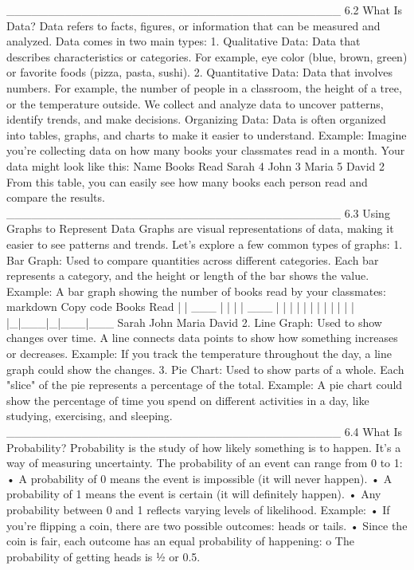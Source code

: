 ________________________________________
6.2 What Is Data?
Data refers to facts, figures, or information that can be measured and analyzed. Data comes in two main types:
1.	Qualitative Data: Data that describes characteristics or categories. For example, eye color (blue, brown, green) or favorite foods (pizza, pasta, sushi).
2.	Quantitative Data: Data that involves numbers. For example, the number of people in a classroom, the height of a tree, or the temperature outside.
We collect and analyze data to uncover patterns, identify trends, and make decisions.
Organizing Data:
Data is often organized into tables, graphs, and charts to make it easier to understand.
Example: Imagine you're collecting data on how many books your classmates read in a month. Your data might look like this:
Name	Books Read
Sarah	4
John	3
Maria	5
David	2
From this table, you can easily see how many books each person read and compare the results.
________________________________________
6.3 Using Graphs to Represent Data
Graphs are visual representations of data, making it easier to see patterns and trends. Let’s explore a few common types of graphs:
1.	Bar Graph: Used to compare quantities across different categories. Each bar represents a category, and the height or length of the bar shows the value.
Example: A bar graph showing the number of books read by your classmates:
markdown
Copy code
Books Read
|
|        ___
|       |   |
|  ___  |   |
| |   | |   |
| |   | |   |
|_|___|_|___|___
  Sarah John Maria David
2.	Line Graph: Used to show changes over time. A line connects data points to show how something increases or decreases.
Example: If you track the temperature throughout the day, a line graph could show the changes.
3.	Pie Chart: Used to show parts of a whole. Each "slice" of the pie represents a percentage of the total.
Example: A pie chart could show the percentage of time you spend on different activities in a day, like studying, exercising, and sleeping.
________________________________________
6.4 What Is Probability?
Probability is the study of how likely something is to happen. It’s a way of measuring uncertainty. The probability of an event can range from 0 to 1:
•	A probability of 0 means the event is impossible (it will never happen).
•	A probability of 1 means the event is certain (it will definitely happen).
•	Any probability between 0 and 1 reflects varying levels of likelihood.
Example:
•	If you're flipping a coin, there are two possible outcomes: heads or tails.
•	Since the coin is fair, each outcome has an equal probability of happening:
o	The probability of getting heads is ½ or 0.5.
